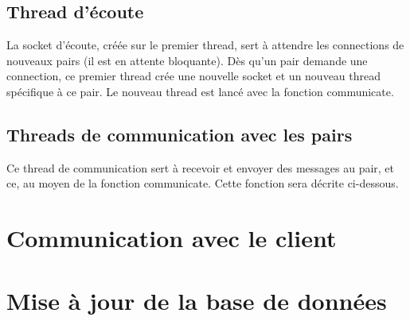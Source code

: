 \subsection{Thread d'écoute}
La socket d'écoute, créée sur le premier thread, sert à attendre les connections de nouveaux pairs (il est en attente bloquante). Dès qu'un pair demande une connection, ce premier thread crée une nouvelle socket et un nouveau thread spécifique à ce pair.
Le nouveau thread est lancé avec la fonction communicate.
\subsection{Threads de communication avec les pairs}
Ce thread de communication sert à recevoir et envoyer des messages au pair, et ce, au moyen de la fonction communicate. Cette fonction sera décrite ci-dessous.


\section{Communication avec le client}


\section{Mise à jour de la base de données}

